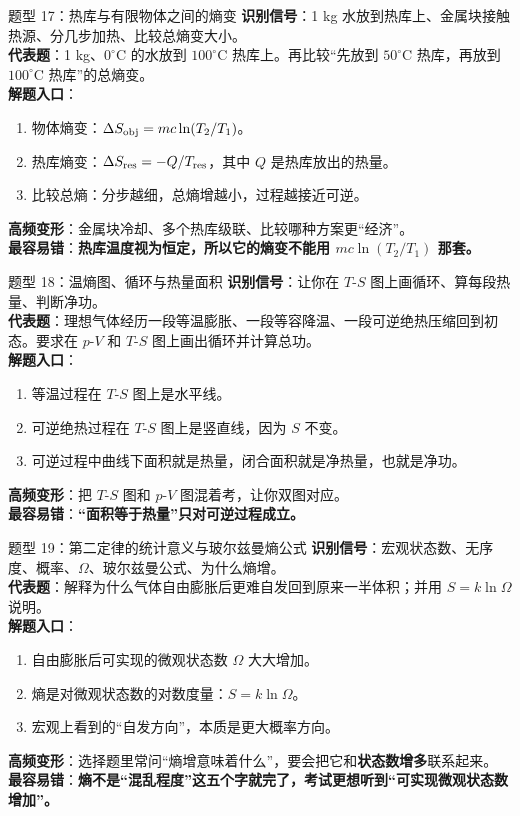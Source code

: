 \documentclass[11pt,a4paper]{ctexart}
\newcommand{\key}[1]{\textcolor{theme}{\textbf{#1}}}
\newcommand{\warn}[1]{\textcolor{red!70!black}{\textbf{#1}}}
\begin{document}
\begin{typebox}{题型 17：热库与有限物体之间的熵变}
\textbf{识别信号}：1 kg 水放到热库上、金属块接触热源、分几步加热、比较总熵变大小。\\
\textbf{代表题}：1 kg、\(0^\circ\mathrm{C}\) 的水放到 \(100^\circ\mathrm{C}\) 热库上。再比较“先放到 \(50^\circ\mathrm{C}\) 热库，再放到 \(100^\circ\mathrm{C}\) 热库”的总熵变。\\
\textbf{解题入口}：
\begin{enumerate}
  \item 物体熵变：\(\Delta S_{\rm obj}=mc\ln(T_2/T_1)\)。
  \item 热库熵变：\(\Delta S_{\rm res}=-Q/T_{\rm res}\)，其中 \(Q\) 是热库放出的热量。
  \item 比较总熵：分步越细，总熵增越小，过程越接近可逆。
\end{enumerate}
\textbf{高频变形}：金属块冷却、多个热库级联、比较哪种方案更“经济”。\\
\textbf{最容易错}：\warn{热库温度视为恒定，所以它的熵变不能用 \(mc\ln(T_2/T_1)\) 那套。}
\end{typebox}

\begin{typebox}{题型 18：温熵图、循环与热量面积}
\textbf{识别信号}：让你在 \(T\)-\(S\) 图上画循环、算每段热量、判断净功。\\
\textbf{代表题}：理想气体经历一段等温膨胀、一段等容降温、一段可逆绝热压缩回到初态。要求在 \(p\)-\(V\) 和 \(T\)-\(S\) 图上画出循环并计算总功。\\
\textbf{解题入口}：
\begin{enumerate}
  \item 等温过程在 \(T\)-\(S\) 图上是水平线。
  \item 可逆绝热过程在 \(T\)-\(S\) 图上是竖直线，因为 \(S\) 不变。
  \item 可逆过程中曲线下面积就是热量，闭合面积就是净热量，也就是净功。
\end{enumerate}
\textbf{高频变形}：把 \(T\)-\(S\) 图和 \(p\)-\(V\) 图混着考，让你双图对应。\\
\textbf{最容易错}：\warn{“面积等于热量”只对可逆过程成立。}
\end{typebox}

\begin{typebox}{题型 19：第二定律的统计意义与玻尔兹曼熵公式}
\textbf{识别信号}：宏观状态数、无序度、概率、\(\Omega\)、玻尔兹曼公式、为什么熵增。\\
\textbf{代表题}：解释为什么气体自由膨胀后更难自发回到原来一半体积；并用 \(S=k\ln\Omega\) 说明。\\
\textbf{解题入口}：
\begin{enumerate}
  \item 自由膨胀后可实现的微观状态数 \(\Omega\) 大大增加。
  \item 熵是对微观状态数的对数度量：\(S=k\ln\Omega\)。
  \item 宏观上看到的“自发方向”，本质是更大概率方向。
\end{enumerate}
\textbf{高频变形}：选择题里常问“熵增意味着什么”，要会把它和\key{状态数增多}联系起来。\\
\textbf{最容易错}：\warn{熵不是“混乱程度”这五个字就完了，考试更想听到“可实现微观状态数增加”。}
\end{typebox}
\end{document}
